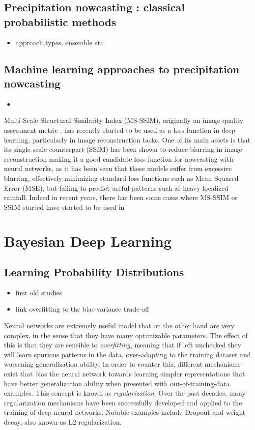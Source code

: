 \subsection{Precipitation nowcasting : classical probabilistic methods}
\begin{itemize}
	\item approach types, ensemble etc
\end{itemize}

\subsection{Machine learning approaches to precipitation nowcasting}
\begin{itemize}
	\item 
\end{itemize}

Multi-Scale Structural Similarity Index (MS-SSIM), originally an image quality assessment metric \cite{wang_multiscale_2003}, has recently started to be used as a loss function in deep learning, particularly in image reconstruction tasks. One of its main assets is that its single-scale counterpart (SSIM) has been shown to reduce blurring in image reconstruction \cite{zhao_loss_2017} making it a good candidate loss function for nowcasting with neural networks, as it has been seen that these models suffer from excessive blurring, effectively minimizing standard loss functions such as Mean Squared Error (MSE), but failing to predict useful patterns such as heavy localized rainfall. Indeed in recent years, there has been some cases where MS-SSIM or SSIM started have started to be used in 

\section{Bayesian Deep Learning}

\subsection{Learning Probability Distributions}
\begin{itemize}
	\item first old studies
	\item link overfitting to the bias-variance trade-off
\end{itemize}

	Neural networks are extremely useful model that on the other hand are very complex, in the sense that they have many optimizable parameters. The effect of this is that they are sensible to \textit{overfitting}, meaning that if left unchecked they will learn spurious patterns in the data, over-adapting to the training dataset and worsening generalization ability. In order to counter this, different mechanisms exist that bias the neural network towards learning simpler representations that have better generalization ability when presented with out-of-training-data examples. This concept is known as \textit{regularization}. Over the past decades, many regularization mechanisms have been successfully developed and applied to the training of deep neural networks. Notable examples include Dropout and weight decay, also known as L2-regularization.  
	

